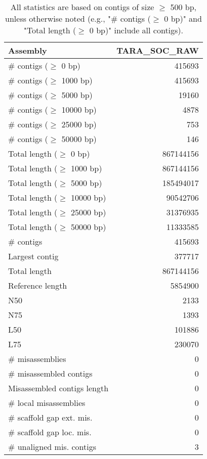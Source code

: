 \documentclass[12pt,a4paper]{article}
\begin{document}
\begin{table}[ht]
\begin{center}
\caption{All statistics are based on contigs of size $\geq$ 500 bp, unless otherwise noted (e.g., "\# contigs ($\geq$ 0 bp)" and "Total length ($\geq$ 0 bp)" include all contigs).}
\begin{tabular}{|l*{1}{|r}|}
\hline
Assembly & TARA\_SOC\_RAW \\ \hline
\# contigs ($\geq$ 0 bp) & 415693 \\ \hline
\# contigs ($\geq$ 1000 bp) & 415693 \\ \hline
\# contigs ($\geq$ 5000 bp) & 19160 \\ \hline
\# contigs ($\geq$ 10000 bp) & 4878 \\ \hline
\# contigs ($\geq$ 25000 bp) & 753 \\ \hline
\# contigs ($\geq$ 50000 bp) & 146 \\ \hline
Total length ($\geq$ 0 bp) & 867144156 \\ \hline
Total length ($\geq$ 1000 bp) & 867144156 \\ \hline
Total length ($\geq$ 5000 bp) & 185494017 \\ \hline
Total length ($\geq$ 10000 bp) & 90542706 \\ \hline
Total length ($\geq$ 25000 bp) & 31376935 \\ \hline
Total length ($\geq$ 50000 bp) & 11333585 \\ \hline
\# contigs & 415693 \\ \hline
Largest contig & 377717 \\ \hline
Total length & 867144156 \\ \hline
Reference length & 5854900 \\ \hline
N50 & 2133 \\ \hline
N75 & 1393 \\ \hline
L50 & 101886 \\ \hline
L75 & 230070 \\ \hline
\# misassemblies & 0 \\ \hline
\# misassembled contigs & 0 \\ \hline
Misassembled contigs length & 0 \\ \hline
\# local misassemblies & 0 \\ \hline
\# scaffold gap ext. mis. & 0 \\ \hline
\# scaffold gap loc. mis. & 0 \\ \hline
\# unaligned mis. contigs & 3 \\ \hline

\end{tabular}
\end{center}
\end{table}
\end{document}
